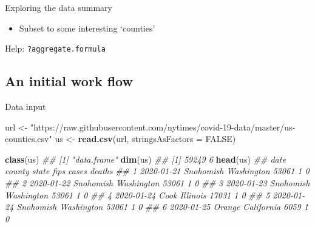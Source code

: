 \documentclass[]{book}
\newenvironment{Shaded}{\begin{snugshade}}{\end{snugshade}}
\newcommand{\CommentTok}[1]{\textcolor[rgb]{0.56,0.35,0.01}{\textit{#1}}}
\newcommand{\DataTypeTok}[1]{\textcolor[rgb]{0.13,0.29,0.53}{#1}}
\newcommand{\KeywordTok}[1]{\textcolor[rgb]{0.13,0.29,0.53}{\textbf{#1}}}
\newcommand{\NormalTok}[1]{#1}
\newcommand{\OperatorTok}[1]{\textcolor[rgb]{0.81,0.36,0.00}{\textbf{#1}}}
\newcommand{\OtherTok}[1]{\textcolor[rgb]{0.56,0.35,0.01}{#1}}
\newcommand{\StringTok}[1]{\textcolor[rgb]{0.31,0.60,0.02}{#1}}
\begin{document}
Exploring the data summary

\begin{itemize}
\item
  Subset to some interesting `counties'

\begin{Shaded}
\end{Shaded}
\end{itemize}

Help: \texttt{?aggregate.formula}

\hypertarget{an-initial-work-flow}{%
\subsection*{An initial work flow}\label{an-initial-work-flow}}

Data input

\begin{Shaded}
\begin{Highlighting}[]
\NormalTok{url <-}\StringTok{ "https://raw.githubusercontent.com/nytimes/covid-19-data/master/us-counties.csv"}
\NormalTok{us <-}\StringTok{ }\KeywordTok{read.csv}\NormalTok{(url, }\DataTypeTok{stringsAsFactors =} \OtherTok{FALSE}\NormalTok{)}
\end{Highlighting}
\end{Shaded}

\begin{Shaded}
\begin{Highlighting}[]
\KeywordTok{class}\NormalTok{(us)}
\CommentTok{## [1] "data.frame"}
\KeywordTok{dim}\NormalTok{(us)}
\CommentTok{## [1] 59249     6}
\KeywordTok{head}\NormalTok{(us)}
\CommentTok{##         date    county      state  fips cases deaths}
\CommentTok{## 1 2020-01-21 Snohomish Washington 53061     1      0}
\CommentTok{## 2 2020-01-22 Snohomish Washington 53061     1      0}
\CommentTok{## 3 2020-01-23 Snohomish Washington 53061     1      0}
\CommentTok{## 4 2020-01-24      Cook   Illinois 17031     1      0}
\CommentTok{## 5 2020-01-24 Snohomish Washington 53061     1      0}
\CommentTok{## 6 2020-01-25    Orange California  6059     1      0}
\end{Highlighting}
\end{Shaded}
\end{document}
